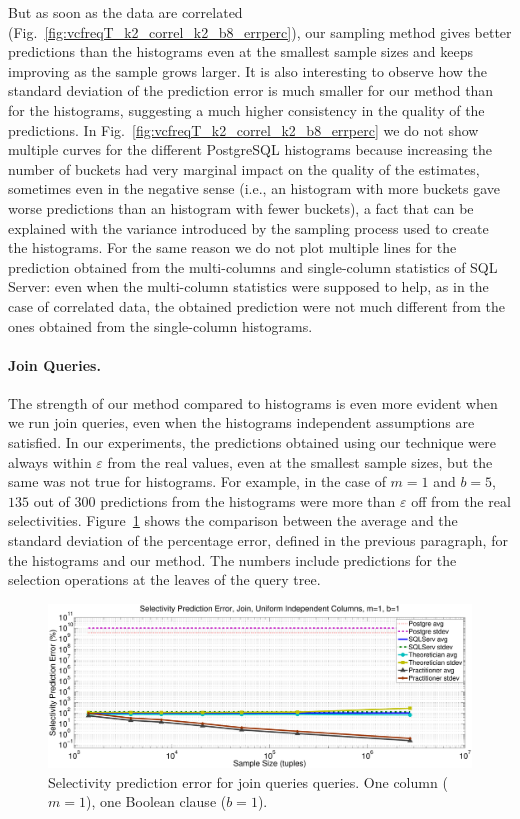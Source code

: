But as soon as the data are
correlated (Fig.~\ref{fig:vcfreqT_k2_correl_k2_b8_errperc}), our sampling method gives better
predictions than the histograms even at the smallest sample sizes and keeps
improving as the sample grows larger. It is also interesting to observe how the
standard deviation of the prediction error is much smaller for our method than
for the histograms, suggesting a much higher consistency in the quality of the
predictions. In Fig.~\ref{fig:vcfreqT_k2_correl_k2_b8_errperc} we do not show multiple
curves for the different PostgreSQL histograms because increasing the number of
buckets had very marginal impact on the quality of the estimates, sometimes even
in the negative sense (i.e., an histogram with more buckets gave worse
predictions than an histogram with fewer buckets), a fact that can be explained
with the variance introduced by the sampling process used to create the
histograms. For the same reason we do not plot multiple lines for the
prediction obtained from the multi-columns and single-column statistics of SQL
Server: even when the multi-column statistics were supposed to help, as in the
case of correlated data, the obtained prediction were not much different from
the ones obtained from the single-column histograms.

\paragraph{Join Queries.} The strength of our method compared to histograms is
even more evident when we run join queries, even when the histograms independent assumptions are
satisfied. In our experiments, the predictions obtained using our technique were
always within $\varepsilon$ from the real values, even at the smallest sample
sizes, but the same was not true for histograms. For example, in the case of
$m=1$ and $b=5$, $135$ out of $300$ predictions from the histograms were more
than $\varepsilon$ off from the real selectivities.
Figure~\ref{fig:vcfreqjoin_k1_b1_errperc} shows the comparison between the average and
the standard deviation of the percentage error, defined in the previous
paragraph, for the histograms and our method. The numbers include predictions
for the selection operations at the leaves of the query tree.

\begin{figure}[htbp]
  \centering
  \includegraphics[scale=0.3]{vcfreq/join_k1_b1_errperc}
  \caption{Selectivity prediction error for join queries queries. One column
  ($m=1$), one Boolean clause ($b=1$).}
  \label{fig:vcfreqjoin_k1_b1_errperc}
\end{figure}

